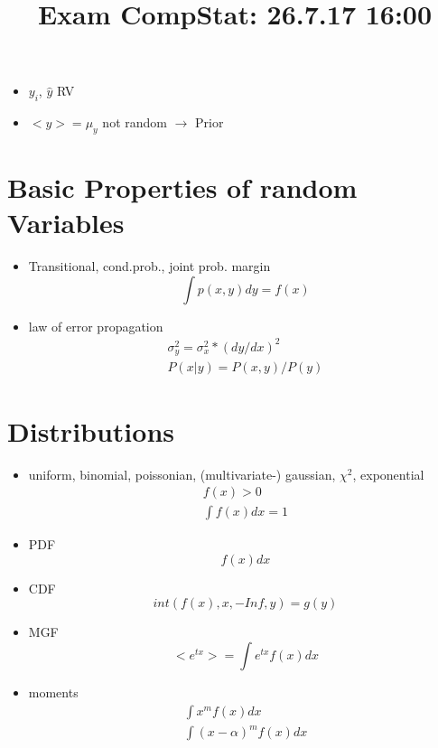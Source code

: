 \documentclass[twocolumn, a4paper, 11pt]{scrartcl}
\title{Exam CompStat: 26.7.17 16:00}
\begin{document}
    \maketitle

    \begin{itemize}
      \item $y_i$, $\hat{y}$ RV
      \item $< y > = \mu_y$ not random $\rightarrow$ Prior
    \end{itemize}

    \section{Basic Properties of random Variables}

      \begin{itemize}
        \item Transitional, cond.prob., joint prob. margin
        \[
          \int p(x,y) dy = f(x)
        \]
        \item law of error propagation
        \begin{align*}
          \sigma^2_y = \sigma^2_x*(dy/dx)^2\\
          P(x|y) = P(x,y)/P(y)
        \end{align*}
      \end{itemize}

    \section{Distributions}\label{distributions}

    \begin{itemize}
      \item uniform, binomial, poissonian, (multivariate-) gaussian, $\chi^2$, exponential
        \begin{align*}
          f(x) > 0\\
          \int f(x) d x = 1
        \end{align*}
      \item PDF
        \[ f(x)dx\]
      \item CDF
        \[ int(f(x), x, -Inf, y) = g(y)\]
      \item MGF
        \[
          < e^{tx} > = \int e^{tx} f(x) dx
        \]
      \item moments
        \begin{align*}
          \int x^m f(x) dx\\
          \int (x-\alpha)^m f(x) dx
        \end{align*}
    \end{itemize}
\end{document}
